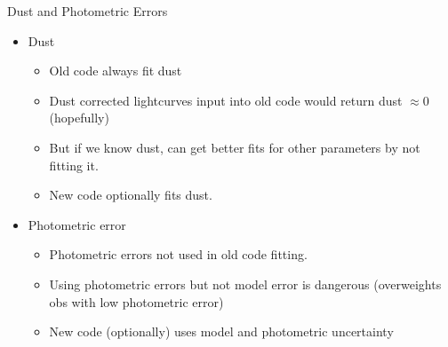 \documentclass[12pt]{beamer}
\begin{document}


\begin{frame}{Dust and Photometric Errors}
  \begin{itemize}
    \item Dust
  \begin{itemize}
  \item Old code always fit dust
  \item Dust corrected lightcurves input into old code would return dust $\approx 0$ (hopefully)
  \item But if we know dust, can get better fits for other parameters by not fitting it.
  \item New code optionally fits dust.
  \end{itemize}
\item Photometric error
  \begin{itemize}
  \item Photometric errors not used in old code fitting.
  \item Using photometric errors but not model error is dangerous (overweights obs with low photometric error)
  \item New code (optionally) uses model and photometric uncertainty
  \end{itemize}
  \end{itemize}
  \end{frame}
\end{document}

